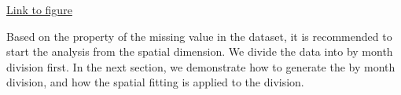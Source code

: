 \begin{framed}
\begin{center}
  \href{../plots/a1950/a1950.consecutive.miss.station.pdf}{Link to figure}
  \label{quant.consecutivemiss}
\end{center}
\end{framed}

Based on the property of the missing value in the dataset, it is recommended to
start the analysis from the spatial dimension. We divide the data into 
by month division first. In the next section, we demonstrate how to generate the
by month division, and how the spatial fitting is applied to the division.